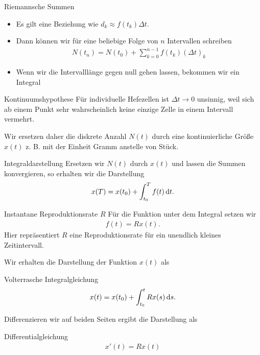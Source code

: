 \documentclass[notheorems,hidelinks,aspectratio=1610]{beamer}
\begin{document}
\begin{frame}{Riemannsche Summen}
  \begin{itemize}
  \item Es gilt eine Beziehung wie
    $d_k \approx f(t_k)\Delta t$.
  \item Dann können wir für eine beliebige Folge von $n$ Intervallen
    schreiben
    \begin{gather*}
      N(t_n) = N(t_0) + \sum_{k=0}^{n-1} f(t_k) (\Delta t)_k
    \end{gather*}
    \item Wenn wir die Intervalllänge gegen null gehen lassen, bekommen wir ein Integral
  \end{itemize}
  \pause
  \begin{block}{Kontinuumshypothese}
    Für individuelle Hefezellen ist $\Delta t \to 0$ unsinnig, weil sich ab einem Punkt sehr wahrscheinlich keine einzige Zelle in einem Intervall vermehrt.

    \vspace{1ex}

    Wir ersetzen daher die diskrete Anzahl $N(t)$ durch eine
    kontinuierliche Größe $x(t)$ z. B. mit der Einheit Gramm anstelle
    von Stück.
  \end{block}
\end{frame}

\begin{frame}{Integraldarstellung}
  Ersetzen wir $N(t)$ durch $x(t)$ und lassen die Summen konvergieren, so erhalten wir die Darstellung
    \begin{gather*}
      x(T) = x(t_0) + \int_{t_0}^T f(t) \,\mathrm{d} t.      
    \end{gather*}
  \begin{block}{Instantane Reproduktionsrate $R$}
    Für die Funktion unter dem Integral setzen wir
    \begin{gather*}
      f(t) = R x(t).
    \end{gather*}
    Hier repräsentiert $R$ eine Reproduktionsrate für ein unendlich kleines Zeitintervall.
  \end{block}
\end{frame}

\begin{frame}
  Wir erhalten die Darstellung der Funktion $x(t)$ als
  \begin{block}{Volterrasche Integralgleichung}
    \begin{gather*}
      x(t) = x(t_0) + \int_{t_0}^t R x(s) \,\mathrm{d} s.      
    \end{gather*}    
  \end{block}

  Differenzieren wir auf beiden Seiten ergibt die Darstellung als
  \begin{block}{Differentialgleichung}
    \begin{gather*}
          x'(t) = R x(t)
    \end{gather*}
  \end{block}
\end{frame}
\end{document}

